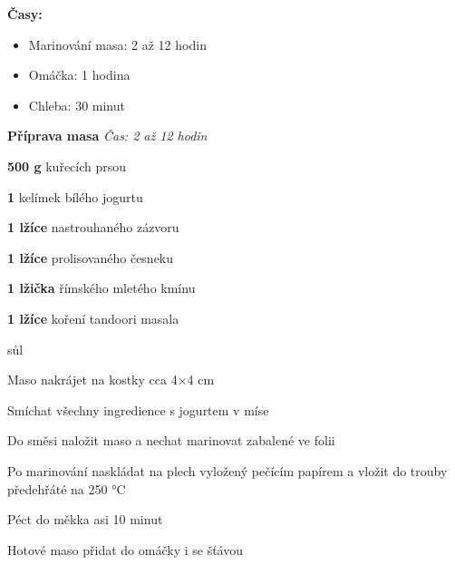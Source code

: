 
\textbf{Časy:}
\begin{itemize}
  \item Marinování masa: 2 až 12 hodin
  \item Omáčka: 1 hodina
  \item Chleba: 30 minut
\end{itemize}

\textbf{Příprava masa}
\emph{Čas: 2 až 12 hodin}
\begin{ingredience}
  \item \textbf{500 g} kuřecích prsou
  \item \textbf{1} kelímek bílého jogurtu
  \item \textbf{1 lžíce} nastrouhaného zázvoru
  \item \textbf{1 lžíce} prolisovaného česneku
  \item \textbf{1 lžička} římského mletého kmínu
  \item \textbf{1 lžíce} koření tandoori masala
  \item sůl
\end{ingredience}
\begin{postup}
  \item Maso nakrájet na kostky cca 4×4 cm
  \item Smíchat všechny ingredience s jogurtem v míse
  \item Do směsi naložit maso a nechat marinovat zabalené ve folii
  \item Po marinování naskládat na plech vyložený pečícím papírem a vložit do trouby předehřáté na 250 °C
  \item Péct do měkka asi 10 minut
  \item Hotové maso přidat do omáčky i se šťávou
\end{postup}

